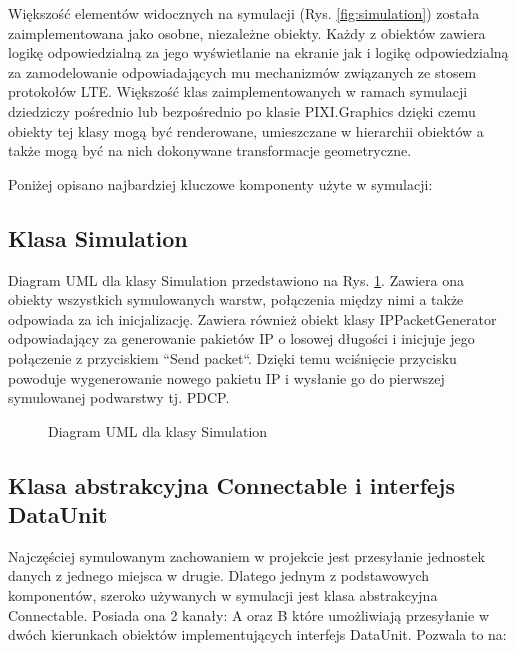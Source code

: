 Większość elementów widocznych na symulacji (Rys. \ref{fig:simulation}) została zaimplementowana jako osobne, niezależne obiekty. Każdy z obiektów zawiera logikę odpowiedzialną za jego wyświetlanie na ekranie jak i logikę odpowiedzialną za zamodelowanie odpowiadających mu mechanizmów związanych ze stosem protokołów LTE. Większość klas zaimplementowanych w ramach symulacji dziedziczy pośrednio lub bezpośrednio po klasie PIXI.Graphics dzięki czemu obiekty tej klasy mogą być renderowane, umieszczane w hierarchii obiektów a także mogą być na nich dokonywane transformacje geometryczne.

Poniżej opisano najbardziej kluczowe komponenty użyte w symulacji:

\subsection{Klasa Simulation}

Diagram UML dla klasy Simulation przedstawiono na Rys. \ref{fig:simulation_class}. Zawiera ona obiekty wszystkich symulowanych warstw, połączenia między nimi a także odpowiada za ich inicjalizację. Zawiera również obiekt klasy IPPacketGenerator odpowiadający za generowanie pakietów IP o losowej długości i inicjuje jego połączenie z przyciskiem ``Send packet``. Dzięki temu wciśnięcie przycisku powoduje wygenerowanie nowego pakietu IP i wysłanie go do pierwszej symulowanej podwarstwy tj. PDCP.

\begin{figure}[ht]
	\centerline{}
	\caption{Diagram UML dla klasy Simulation}
	\label{fig:simulation_class}
\end{figure}

\subsection{Klasa abstrakcyjna Connectable i interfejs DataUnit}

Najczęściej symulowanym zachowaniem w projekcie jest przesyłanie jednostek danych z jednego miejsca w drugie. Dlatego jednym z podstawowych komponentów, szeroko używanych w symulacji jest klasa abstrakcyjna Connectable. Posiada ona 2 kanały: A oraz B które umożliwiają przesyłanie w dwóch kierunkach obiektów implementujących interfejs DataUnit. Pozwala to na:

